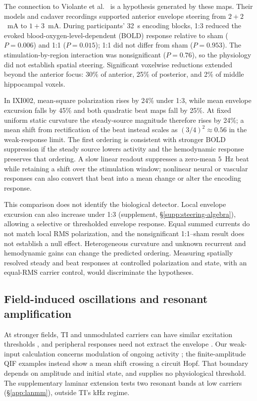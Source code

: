 The connection to Violante et al.\ \cite{violante2023} is a hypothesis generated
by these maps. Their models and cadaver recordings supported anterior envelope
steering from $2+2$~mA to $1+3$~mA. During participants' 32~s encoding blocks,
1:3 reduced the evoked blood-oxygen-level-dependent (BOLD) response relative
to sham ($P=0.006$) and 1:1 ($P=0.015$); 1:1 did not differ from sham
($P=0.953$). The stimulation-by-region interaction was nonsignificant
($P=0.76$), so the physiology did not establish spatial steering. Significant
voxelwise reductions extended beyond the anterior focus: 30\% of anterior,
25\% of posterior, and 2\% of middle hippocampal voxels.

In IXI002, mean-square polarization rises by 24\% under 1:3, while mean
envelope excursion falls by 45\% and both quadratic beat maps fall by 25\%.
At fixed uniform static curvature the steady-source magnitude therefore rises
by 24\%; a mean shift from rectification of the beat instead scales as
$(3/4)^2\approx0.56$ in the weak-response limit. The first ordering is
consistent with stronger BOLD suppression if the steady source lowers activity
and the hemodynamic response preserves that ordering. A slow linear readout
suppresses a zero-mean $5$~Hz beat while retaining a shift over the stimulation
window; nonlinear neural or vascular responses can also convert that beat into
a mean change or alter the encoding response.

This comparison does not identify the biological detector. Local envelope excursion can also increase under 1:3
(supplement, \S\ref{supp:steering-algebra}), allowing a selective or
thresholded envelope response. Equal summed currents do not match local RMS polarization,
and the nonsignificant 1:1--sham result does not establish a null effect.
Heterogeneous curvature and unknown recurrent and hemodynamic gains can change
the predicted ordering. Measuring spatially resolved steady and beat responses
at controlled polarization and state, with an equal-RMS carrier control,
would discriminate the hypotheses.
\ifjne\else

\fi

\subsection{Field-induced oscillations and resonant amplification}
At stronger fields, TI and unmodulated carriers can have similar excitation
thresholds \cite{opancar2025,semenov2025}, and peripheral responses need not
extract the envelope \cite{peripheral2023}. Our weak-input calculation concerns
modulation of ongoing activity \cite{vieira2024}; the finite-amplitude
QIF examples instead show a mean shift crossing a circuit Hopf. That boundary
depends on amplitude and initial state, and supplies no physiological threshold.
The supplementary laminar extension tests two resonant bands at low carriers
(\S\ref{app:lanmm}), outside TI's kHz regime.

